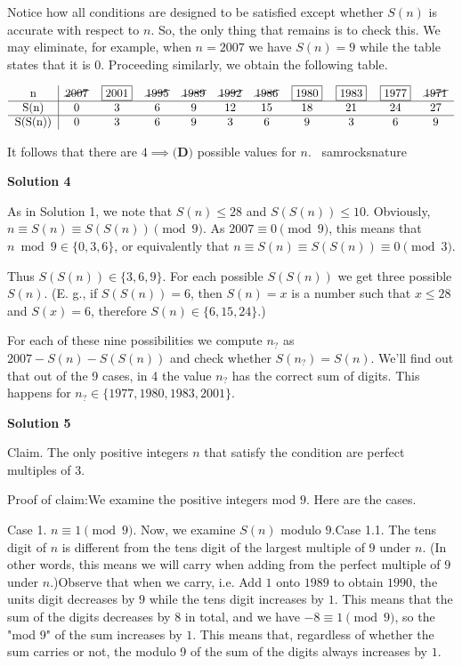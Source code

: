 \begin{enumerate}
 

 Notice how all conditions are designed to be satisfied except whether $S(n)$ is accurate with respect to $n.$ So, the only thing that remains is to check this. We may eliminate, for example, when $n=2007$ we have $S(n)=9$ while the table states that it is $0.$ Proceeding similarly, we obtain the following table.

 $\begin{tabular}{c|c c c c c c c c c c}  n & \cancel{2007} & \boxed{2001} & \cancel{1995} & \cancel{1989} & \cancel{1992} & \cancel{1986} & \boxed{1980} & \boxed{1983} & \boxed{1977} & \cancel{1971} \\ \hline  S(n) & 0 & 3 & 6 & 9 & 12 & 15 & 18 & 21 & 24 & 27 \\ \hline S(S(n)) & 0 & 3 & 6 & 9 & 3 & 6 & 9 & 3 & 6 & 9 \\ \end{tabular}$

 

 It follows that there are $\boxed{4}\implies \textbf{(D)}$ possible values for $n.$ ~samrocksnature

 



\textbf{Solution 4}

As in Solution 1, we note that $S(n)\leq 28$ and $S(S(n))\leq 10$. 
Obviously, $n\equiv S(n)\equiv S(S(n)) \pmod 9$.  
As $2007\equiv 0 \pmod 9$, this means that $n\bmod 9 \in\{0,3,6\}$, or equivalently that $n\equiv S(n)\equiv S(S(n))\equiv 0 \pmod 3$.

 Thus $S(S(n))\in\{3,6,9\}$. For each possible $S(S(n))$ we get three possible $S(n)$.  
(E. g., if $S(S(n))=6$, then $S(n)=x$ is a number such that $x\leq 28$ and $S(x)=6$, therefore $S(n)\in\{6,15,24\}$.)

 For each of these nine possibilities we compute $n_{?}$ as $2007-S(n)-S(S(n))$ and check whether $S(n_{?})=S(n)$.  
We'll find out that out of the 9 cases, in 4 the value $n_{?}$ has the correct sum of digits.  
This happens for $n_{?}\in \{ 1977, 1980, 1983, 2001 \}$.

 



\textbf{Solution 5}

Claim. The only positive integers $n$ that satisfy the condition are perfect multiples of $3$.

 Proof of claim:We examine the positive integers mod $9$. Here are the cases.

 Case 1. $n \equiv 1 \pmod 9$. Now, we examine $S(n)$ modulo $9$.Case 1.1. The tens digit of $n$ is different from the tens digit of the largest multiple of $9$ under $n$. (In other words, this means we will carry when adding from the perfect multiple of $9$ under $n$.)Observe that when we carry, i.e. Add $1$ onto $1989$ to obtain $1990$, the units digit decreases by $9$ while the tens digit increases by $1$. This means that the sum of the digits decreases by $8$ in total, and we have $-8 \equiv 1 \pmod 9$, so the "mod 9" of the sum increases by $1$. This means that, regardless of whether the sum carries or not, the modulo 9 of the sum of the digits always increases by $1$.


\end{enumerate}
